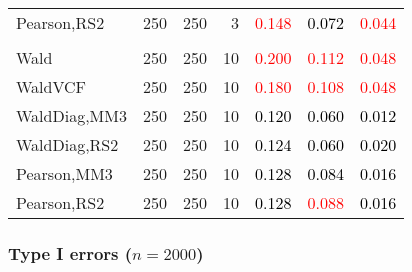 \documentclass[
]{article}
\begin{document}
\begin{table}[H]
{\begin{tabular}[t]{lrrrrrr}
\hspace{1em}Pearson,RS2 & 250 & 250 & 3 & \textcolor{red}{0.148} & \textcolor{black}{0.072} & \textcolor{red}{0.044}\\
\addlinespace[0.3em]
\multicolumn{7}{l}{\textbf{3F 15V}}\\
\hspace{1em}Wald & 250 & 250 & 10 & \textcolor{red}{0.200} & \textcolor{red}{0.112} & \textcolor{red}{0.048}\\
\hspace{1em}WaldVCF & 250 & 250 & 10 & \textcolor{red}{0.180} & \textcolor{red}{0.108} & \textcolor{red}{0.048}\\
\hspace{1em}WaldDiag,MM3 & 250 & 250 & 10 & \textcolor{black}{0.120} & \textcolor{black}{0.060} & \textcolor{black}{0.012}\\
\hspace{1em}WaldDiag,RS2 & 250 & 250 & 10 & \textcolor{black}{0.124} & \textcolor{black}{0.060} & \textcolor{black}{0.020}\\
\hspace{1em}Pearson,MM3 & 250 & 250 & 10 & \textcolor{black}{0.128} & \textcolor{black}{0.084} & \textcolor{black}{0.016}\\
\hspace{1em}Pearson,RS2 & 250 & 250 & 10 & \textcolor{black}{0.128} & \textcolor{red}{0.088} & \textcolor{black}{0.016}\\
\bottomrule
\end{tabular}}
\endgroup{}
\end{table}

\hypertarget{type-i-errors-n2000-2}{%
\subsubsection{\texorpdfstring{Type I errors
(\(n=2000\))}{Type I errors (n=2000)}}\label{type-i-errors-n2000-2}}
\end{document}
